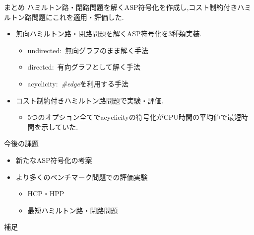 \documentclass[dvipdfmx,11pt]{beamer}
\begin{document}
\begin{frame}{まとめ}
  ハミルトン路・閉路問題を解くASP符号化を作成し,コスト制約付きハミルトン路問題にこれを適用・評価した.
  \begin{itemize}
  \item 無向ハミルトン路・閉路問題を解くASP符号化を3種類実装.
    \begin{itemize}
    \item \alert{undirected}:\ 無向グラフのまま解く手法      
    \item \alert{directed}:\ 有向グラフとして解く手法
    \item \alert{acyclicity}:\ \textit{\#edge}を利用する手法      
    \end{itemize}
  \item コスト制約付きハミルトン路問題で実験・評価.
    \begin{itemize}
    \item 5つのオプション全てでacyclicityの符号化がCPU時間の平均値で最短時間を示していた.
    \end{itemize}
  \end{itemize}
  \begin{alertblock}{今後の課題}
    \begin{itemize}
    \item 新たなASP符号化の考案
    \item より多くのベンチマーク問題での評価実験
      \begin{itemize}
      \item HCP・HPP
      \item 最短ハミルトン路・閉路問題
      \end{itemize}
    \end{itemize}
  \end{alertblock}
\end{frame}
\begin{frame}[noframenumbering]{}
  補足
\end{frame}
\end{document}
